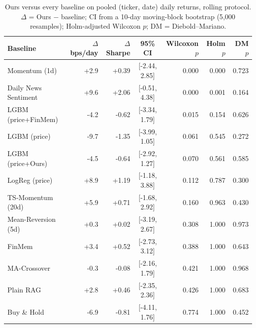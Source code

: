 \begin{table}[ht]
\centering
\caption{Ours versus every baseline on pooled (ticker, date) daily returns, rolling protocol. $\Delta$ = Ours $-$ baseline; CI from a 10-day moving-block bootstrap (5{,}000 resamples); Holm-adjusted Wilcoxon $p$; DM = Diebold--Mariano.}
\label{tab:tests}
\small
\begin{tabular}{lrrcrrr}
\hline
Baseline & $\Delta$ bps/day & $\Delta$Sharpe & 95\% CI & Wilcoxon $p$ & Holm $p$ & DM $p$ \\
\hline
Momentum (1d) & +2.9 & +0.39 & [-2.44, 2.85] & 0.000 & 0.000 & 0.723 \\
Daily News Sentiment & +9.6 & +2.06 & [-0.51, 4.38] & 0.000 & 0.001 & 0.164 \\
LGBM (price+FinMem) & -4.2 & -0.62 & [-3.34, 1.79] & 0.015 & 0.154 & 0.626 \\
LGBM (price) & -9.7 & -1.35 & [-3.99, 1.05] & 0.061 & 0.545 & 0.272 \\
LGBM (price+Ours) & -4.5 & -0.64 & [-2.92, 1.27] & 0.070 & 0.561 & 0.585 \\
LogReg (price) & +8.9 & +1.19 & [-1.18, 3.88] & 0.112 & 0.787 & 0.300 \\
TS-Momentum (20d) & +5.9 & +0.71 & [-1.68, 2.92] & 0.160 & 0.963 & 0.430 \\
Mean-Reversion (5d) & +0.3 & +0.02 & [-3.19, 2.67] & 0.308 & 1.000 & 0.973 \\
FinMem & +3.4 & +0.52 & [-2.73, 3.12] & 0.388 & 1.000 & 0.643 \\
MA-Crossover & -0.3 & -0.08 & [-2.16, 1.79] & 0.421 & 1.000 & 0.968 \\
Plain RAG & +2.8 & +0.46 & [-2.35, 2.36] & 0.426 & 1.000 & 0.683 \\
Buy \& Hold & -6.9 & -0.81 & [-4.11, 1.76] & 0.774 & 1.000 & 0.452 \\
\hline
\end{tabular}
\end{table}
